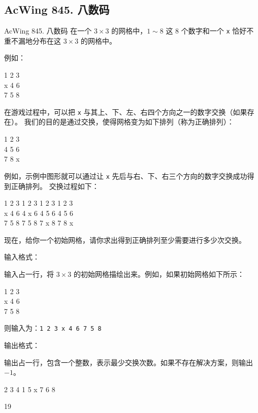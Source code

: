 \subsection{AcWing 845. 八数码}
\begin{titledbox}{AcWing 845. 八数码}
    在一个 $3 \times 3$ 的网格中，$1 \sim 8$ 这 $8$ 个数字和一个 \lstinline{x} 恰好不重不漏地分布在这 $3 \times 3$ 的网格中。

    例如：

    1 2 3 \\
    x 4 6 \\
    7 5 8

    在游戏过程中，可以把 \lstinline{x} 与其上、下、左、右四个方向之一的数字交换（如果存在）。
    我们的目的是通过交换，使得网格变为如下排列（称为正确排列）：

    1 2 3 \\
    4 5 6 \\
    7 8 x

    例如，示例中图形就可以通过让 \lstinline{x} 先后与右、下、右三个方向的数字交换成功得到正确排列。
    交换过程如下：

    1 2 3 \hspace{1em} 1 2 3 \hspace{1em} 1 2 3 \hspace{1em} 1 2 3 \\
    x 4 6 \hspace{1em} 4 x 6 \hspace{1em} 4 5 6 \hspace{1em} 4 5 6 \\
    7 5 8 \hspace{1em} 7 5 8 \hspace{1em} 7 x 8 \hspace{1em} 7 8 x

    现在，给你一个初始网格，请你求出得到正确排列至少需要进行多少次交换。

    输入格式：

    输入占一行，将 $3 \times 3$ 的初始网格描绘出来。例如，如果初始网格如下所示：

    1 2 3 \\
    x 4 6 \\
    7 5 8

    则输入为：\lstinline{1 2 3 x 4 6 7 5 8}

    输出格式：

    输出占一行，包含一个整数，表示最少交换次数。如果不存在解决方案，则输出 $-1$。

    \begin{inputblock}
        2 3 4 1 5 x 7 6 8
    \end{inputblock}
    \begin{outputblock}
        19
    \end{outputblock}
\end{titledbox}


